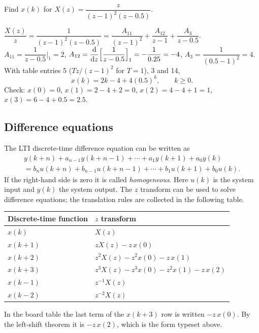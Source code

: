 \begin{problem}
Find $x(k)$ for $X(z)=\dfrac{z}{(z-1)^{2}(z-0.5)}$.
\end{problem}
\begin{solution}
$\dfrac{X(z)}{z}=\dfrac{1}{(z-1)^{2}(z-0.5)}=\dfrac{A_{11}}{(z-1)^{2}}+\dfrac{A_{12}}{z-1}+\dfrac{A_3}{z-0.5}$.
$A_{11}=\dfrac{1}{z-0.5}\big|_{1}=2$, $A_{12}=\dfrac{\mathrm{d}}{\mathrm{d} z}\Bigl[\dfrac{1}{z-0.5}\Bigr]_{1}=-\dfrac{1}{0.25}=-4$,
$A_3=\dfrac{1}{(0.5-1)^{2}}=4$. With table entries 5 ($Tz/(z-1)^2$ for $T=1$), 3 and 14,
\[
  x(k)=2k-4+4(0.5)^{k},\qquad k\ge0.
\]
Check: $x(0)=0$, $x(1)=2-4+2=0$, $x(2)=4-4+1=1$, $x(3)=6-4+0.5=2.5$.
\end{solution}

\subsection{Difference equations}
The LTI discrete-time difference equation can be written as
\begin{multline*}
  y(k+n)+a_{n-1}y(k+n-1)+\cdots+a_1y(k+1)+a_0y(k)\\
  =b_nu(k+n)+b_{n-1}u(k+n-1)+\cdots+b_1u(k+1)+b_0u(k).
\end{multline*}
If the right-hand side is zero it is called \emph{homogeneous}. Here $u(k)$ is the system input and $y(k)$ the
system output. The $z$ transform can be used to solve difference equations; the translation rules are collected
in the following table.

\begin{center}\renewcommand{\arraystretch}{1.4}
\begin{tabular}{@{}ll@{}}\toprule
Discrete-time function & $z$ transform \\ \midrule
$x(k)$   & $X(z)$ \\
$x(k+1)$ & $zX(z)-z\,x(0)$ \\
$x(k+2)$ & $z^{2}X(z)-z^{2}x(0)-z\,x(1)$ \\
$x(k+3)$ & $z^{3}X(z)-z^{3}x(0)-z^{2}x(1)-z\,x(2)$ \\
$x(k-1)$ & $z^{-1}X(z)$ \\
$x(k-2)$ & $z^{-2}X(z)$ \\ \bottomrule
\end{tabular}
\end{center}

\begin{boardnote}
In the board table the last term of the $x(k+3)$ row is written $-z\,x(0)$. By the left-shift theorem it is
$-z\,x(2)$, which is the form typeset above.
\end{boardnote}

